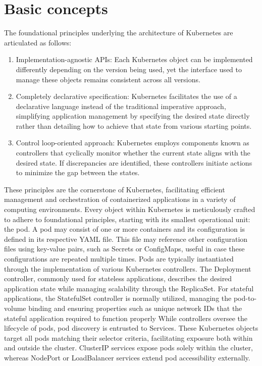 \section{Basic concepts}
The foundational principles underlying the architecture of Kubernetes are articulated as follows:
\begin{enumerate}
\item Implementation-agnostic APIs: Each Kubernetes object can be implemented differently depending on the version being used, yet the interface used to manage these objects remains consistent across all versions.
\item Completely declarative specification: Kubernetes facilitates the use of a declarative language instead of the traditional imperative approach, simplifying application management by specifying the desired state directly rather than detailing how to achieve that state from various starting points.
\item Control loop-oriented approach: Kubernetes employs components known as controllers that cyclically monitor whether the current state aligns with the desired state. If discrepancies are identified, these controllers initiate actions to minimize the gap between the states.
\end{enumerate}
These principles are the cornerstone of Kubernetes, facilitating efficient management and orchestration of containerized applications in a variety of computing environments.
Every object within Kubernetes is meticulously crafted to adhere to foundational principles, starting with its smallest operational unit: the pod. A pod may consist of one or more containers and its configuration is defined in its respective YAML file. This file may reference other configuration files using key-value pairs, such as Secrets or ConfigMaps, useful in case these configurations are repeated multiple times. 
Pods are typically instantiated through the implementation of various Kubernetes controllers. The Deployment controller, commonly used for stateless applications, describes the desired application state while managing scalability through the ReplicaSet. For stateful applications, the StatefulSet controller is normally utilized, managing the pod-to-volume binding and ensuring properties such as unique network IDs that the stateful application required to function properly
While controllers oversee the lifecycle of pods, pod discovery is entrusted to Services. These Kubernetes objects target all pods matching their selector criteria, facilitating exposure both within and outside the cluster. ClusterIP services expose pods solely within the cluster, whereas NodePort or LoadBalancer services extend pod accessibility externally.
